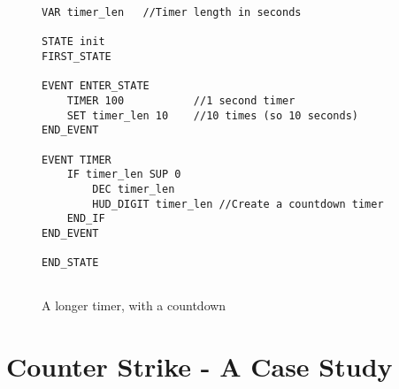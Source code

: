 \documentclass[12pt,a4paper]{scrbook}
\begin{document}
\begin{figure}[h]
\begin{lstlisting}
VAR timer_len	//Timer length in seconds

STATE init
FIRST_STATE

EVENT ENTER_STATE
    TIMER 100			//1 second timer
    SET timer_len 10	//10 times (so 10 seconds)
END_EVENT

EVENT TIMER
    IF timer_len SUP 0
	    DEC timer_len
	    HUD_DIGIT timer_len //Create a countdown timer
    END_IF
END_EVENT

END_STATE
	
\end{lstlisting}
\caption{A longer timer, with a countdown} 
\end{figure}

\chapter{Counter Strike - A Case Study}
\end{document}
